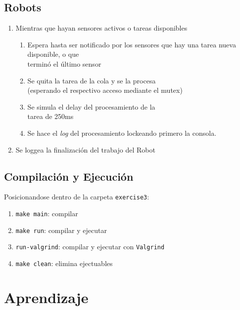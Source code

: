 \documentclass[11pt, a4paper]{article}
\begin{document}
\begin{multicols}{2}
\subsection{Robots}

\begin{enumerate}[label=\Roman*.]
    \item Mientras que hayan sensores activos o tareas disponibles
    \begin{enumerate}[label=\roman*.]
        \item Espera hasta ser notificado por los sensores que hay una tarea nueva disponible, o que\\terminó el último sensor
        \item Se quita la tarea de la cola y se la procesa\\(esperando el respectivo acceso mediante el mutex)
        \item Se simula el delay del procesamiento de la\\tarea de 250ms
        \item Se hace el \textit{log} del procesamiento lockeando primero la consola.
    \end{enumerate}
    \item Se loggea la finalización del trabajo del Robot
\end{enumerate}

\subsection{Compilación y Ejecución}

Posicionandose dentro de la carpeta \lstinline|exercise3|:

\begin{enumerate}[label=\roman*.]
    \item \lstinline|make main|: compilar
    \item \lstinline|make run|: compilar y ejecutar
    \item \lstinline|run-valgrind|: compilar y ejecutar con \lstinline|Valgrind|
    \item \lstinline|make clean|: elimina ejectuables
\end{enumerate}

\newpage

\section*{Aprendizaje}

\end{multicols}
\end{document}
